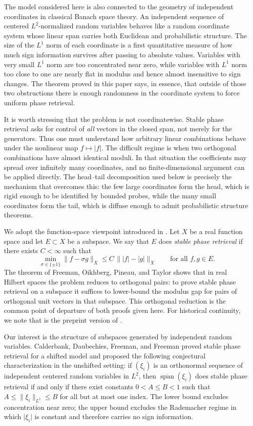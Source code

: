 \documentclass[11pt]{amsart}
\numberwithin{equation}{section}
\theoremstyle{definition}
\theoremstyle{remark}
\newcommand{\Span}{\operatorname{span}}
\newcommand{\abs}[1]{\lvert #1 \rvert}
\newcommand{\norm}[1]{\lVert #1 \rVert}
\begin{document}
The model considered here is also connected to the geometry of independent
coordinates in classical Banach space theory.  An independent sequence of
centered $L^2$-normalized random variables behaves like a random coordinate
system whose linear span carries both Euclidean and probabilistic structure.
The size of the $L^1$ norm of each coordinate is a first quantitative measure
of how much sign information survives after passing to absolute values.
Variables with very small $L^1$ norm are too concentrated near zero, while
variables with $L^1$ norm too close to one are nearly flat in modulus and
hence almost insensitive to sign changes.  The theorem proved in this paper
says, in essence, that outside of those two obstructions there is enough
randomness in the coordinate system to force uniform phase retrieval.

It is worth stressing that the problem is not coordinatewise.  Stable phase
retrieval asks for control of \emph{all} vectors in the closed span, not merely
for the generators.  Thus one must understand how arbitrary linear
combinations behave under the nonlinear map $f\mapsto |f|$.  The difficult
regime is when two orthogonal combinations have almost identical moduli.  In
that situation the coefficients may spread over infinitely many coordinates,
and no finite-dimensional argument can be applied directly.  The
head--tail decomposition used below is precisely the mechanism that overcomes
this: the few large coordinates form the head, which is rigid enough to be
identified by bounded probes, while the many small coordinates form the tail,
which is diffuse enough to admit probabilistic structure theorems.

We adopt the function-space viewpoint introduced in
\cite{FOTP,AG-continuous-frames}.  Let $X$ be a real function space and let
$E\subset X$ be a subspace.  We say that $E$ does \emph{stable phase
retrieval} if there exists $C<\infty$ such that
\[
\min_{\sigma\in\{\pm1\}}\norm{f-\sigma g}_X
\le C\,\norm{\abs{f}-\abs{g}}_X
\qquad\text{for all }f,g\in E.
\]
The theorem of Freeman, Oikhberg, Pineau, and Taylor \cite{FOTP} shows that in
real Hilbert spaces the problem reduces to orthogonal pairs: to prove stable
phase retrieval on a subspace it suffices to lower-bound the modulus gap for
pairs of orthogonal unit vectors in that subspace.  This orthogonal reduction
is the common point of departure of both proofs given here.  For historical
continuity, we note that \cite{our-paper} is the preprint version of
\cite{FOTP}.

Our interest is the structure of subspaces generated by independent random
variables.  Calderbank, Daubechies, Freeman, and Freeman
\cite{calderbank2022stable} proved stable phase retrieval for a shifted model
and proposed the following conjectural characterization in the unshifted
setting: if $(\xi_i)$ is an orthonormal sequence of independent centered
random variables in $L^2$, then $\overline{\Span}(\xi_i)$ does stable phase
retrieval if and only if there exist constants $0<A\le B<1$ such that
$A\le \norm{\xi_i}_{L^1}\le B$ for all but at most one index.  The lower bound
excludes concentration near zero; the upper bound excludes the Rademacher
regime in which $\abs{\xi_i}$ is constant and therefore carries no sign
information.
\end{document}
